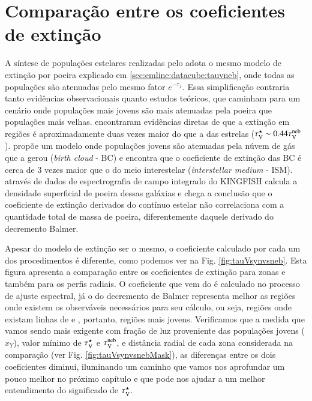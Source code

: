 \section{Comparação entre os coeficientes de extinção}
\label{sec:synvsneb:tauv}

A síntese de populações estelares realizadas pelo \starlight adota o mesmo modelo de extinção por
poeira explicado em \ref{sec:emline:datacube:tauvneb}, onde todas as populações são atenuadas pelo
mesmo fator $e^{-\tau_\lambda}$. Essa simplificação contraria tanto evidências observacionais quanto
estudos teóricos, que caminham para um cenário onde populações mais jovens são mais atenuadas pela
poeira que populações mais velhas. \citet{Calzetti.etal.1994a} encontraram evidências diretas de que
a extinção em regiões \Hii é aproximadamente duas vezes maior do que a das estrelas ($\tau_{\mathrm{V}}^\star \sim
0.44 \tau_{\mathrm{V}}^{\mathrm{neb}}$). \citet{Charlot.Fall.2000a} propõe um modelo onde populações jovens são atenuadas pela
núvem de gás que a gerou ({\em birth cloud} - BC) e encontra que o coeficiente de extinção das BC é
cerca de 3 vezes maior que o do meio interestelar ({\em interstellar medium} - ISM).
\citet{Kreckel.etal.2013a} através de dados de espectrografia de campo integrado do KINGFISH calcula
a densidade superficial de poeira dessas galáxias e chega a conclusão que o coeficiente de extinção
derivados do contínuo estelar não correlaciona com a quantidade total de massa de poeira,
diferentemente daquele derivado do decremento Balmer.

Apesar do modelo de extinção ser o mesmo, o coeficiente calculado por cada um dos procedimentos é
diferente, como podemos ver na Fig. \ref{fig:tauVsynvsneb}. Esta figura apresenta a comparação entre
os coeficientes de extinção para zonas e também para os perfis radiais. O coeficiente que vem do
\starlight é calculado no processo de ajuste espectral, já o do decremento de Balmer representa
melhor as regiões onde existem os observáveis necessários para seu cálculo, ou seja, regiões onde existam
linhas de \Halpha e \Hbeta, portanto, regiões mais jovens. Verificamos que a medida que vamos sendo
mais exigente com fração de luz proveniente das populações jovens ($x_Y$), valor mínimo de $\tau_{\mathrm{V}}^\star$
e $\tau_{\mathrm{V}}^{\mathrm{neb}}$, e distância radial de cada zona considerada na comparação (ver Fig.
\ref{fig:tauVsynvsnebMask}), as diferenças entre os dois coeficientes diminui, iluminando um caminho
que vamos nos aprofundar um pouco melhor no próximo capítulo e que pode nos ajudar a um melhor
entendimento do significado de $\tau_{\mathrm{V}}^\star$.


